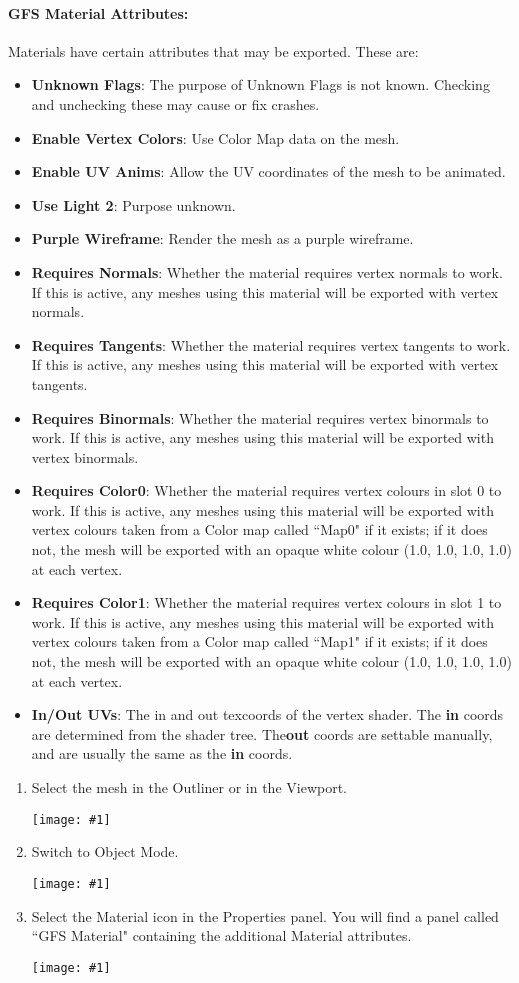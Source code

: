 \documentclass{article}
\newenvironment{guide}[1]
{
	\begin{center}
		\begin{tcolorbox}[%
			colback=black!20, 
			boxrule=0pt, 
			title=Step-by-step: #1,
			enhanced,
			breakable,
			overlay unbroken={%
                \draw[line width=1pt, black, rounded corners]
        	    (frame.north west) rectangle (frame.south east);
			},
    		overlay first={%
        		 \draw[line width=1pt, black, rounded corners]
        	    (frame.south west) -- (frame.north west) -- (frame.north east) -- (frame.south east);
                \draw[line width=1pt, black]
                (frame.south west) -- (frame.south east);
            },
    		overlay middle={%
                \draw[line width=1pt, black]
        	    (frame.north west) rectangle (frame.south east);
        	},
    		overlay last={%
                \draw[line width=1pt, black, rounded corners]
        	    (frame.north west) -- (frame.south west) -- (frame.south east) -- (frame.north east);
                \draw[line width=1pt, black]
                (frame.north west) -- (frame.north east);
           	}
        ]{}
    	\begin{enumerate}
}
{
    		\end{enumerate}
    	\end{tcolorbox}
	\end{center}  	 
}
\newcommand{\guideimage}[1]
{
	\begin{center}
		\texttt{[image: \#1]}
	\end{center}
}
\begin{document}
\paragraph{GFS Material Attributes:}
\noindent Materials have certain attributes that may be exported. These are:
\begin{itemize}
\item \textbf{Unknown Flags}: The purpose of Unknown Flags is not known. Checking and unchecking these may cause or fix crashes.
\item \textbf{Enable Vertex Colors}: Use Color Map data on the mesh.
\item \textbf{Enable UV Anims}: Allow the UV coordinates of the mesh to be animated.
\item \textbf{Use Light 2}: Purpose unknown.
\item \textbf{Purple Wireframe}: Render the mesh as a purple wireframe.
\item \textbf{Requires Normals}: Whether the material requires vertex normals to work. If this is active, any meshes using this material will be exported with vertex normals.
\item \textbf{Requires Tangents}: Whether the material requires vertex tangents to work. If this is active, any meshes using this material will be exported with vertex tangents.
\item \textbf{Requires Binormals}: Whether the material requires vertex binormals to work. If this is active, any meshes using this material will be exported with vertex binormals.
\item \textbf{Requires Color0}: Whether the material requires vertex colours in slot 0 to work. If this is active, any meshes using this material will be exported with vertex colours taken from a Color map called ``Map0" if it exists; if it does not, the mesh will be exported with an opaque white colour (1.0, 1.0, 1.0, 1.0) at each vertex.
\item \textbf{Requires Color1}: Whether the material requires vertex colours in slot 1 to work. If this is active, any meshes using this material will be exported with vertex colours taken from a Color map called ``Map1" if it exists; if it does not, the mesh will be exported with an opaque white colour (1.0, 1.0, 1.0, 1.0) at each vertex.
\item \textbf{In/Out UVs}: The in and out texcoords of the vertex shader. The \textbf{in} coords are determined from the shader tree. The\textbf{out} coords are settable manually, and are usually the same as the \textbf{in} coords.
\end{itemize}
\begin{guide}{Accessing Extra Material Attributes}
\item Select the mesh in the Outliner or in the Viewport.
\guideimage{images/editing_models/edits_select_mesh.png}
\item Switch to Object Mode.
\guideimage{images/editing_models/edits_to_object_mode.png}
\item Select the Material icon in the Properties panel. You will find a panel called ``GFS Material" containing the additional Material attributes.
\guideimage{images/editing_models/edits_material_properties.png}
\end{guide}
\end{document}
